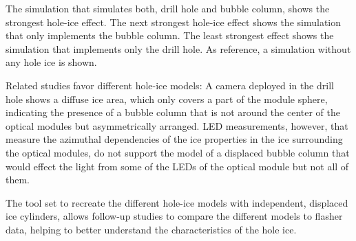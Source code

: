The simulation that simulates both, drill hole and bubble column, shows the strongest hole-ice effect. The next strongest hole-ice effect shows the simulation that only implements the bubble column. The least strongest effect shows the simulation that implements only the drill hole. As reference, a simulation without any hole ice is shown.

Related studies favor different hole-ice models: A camera deployed in the drill hole shows a diffuse ice area, which only covers a part of the module sphere, indicating the presence of a bubble column that is not around the center of the optical modules but asymmetrically arranged. \cite{instrumentation,rongenswedishcamera} LED measurements, however, that measure the azimuthal dependencies of the ice properties in the ice surrounding the optical modules, do not support the model of a displaced bubble column that would effect the light from some of the LEDs of the optical module but not all of them. \cite{rongenswedishcamera}

The tool set to recreate the different hole-ice models with independent, displaced ice cylinders, allows follow-up studies to compare the different models to flasher data, helping to better understand the characteristics of the hole ice.